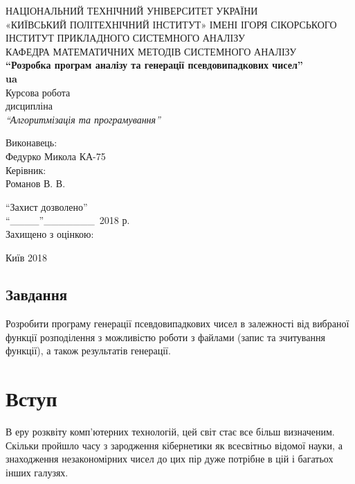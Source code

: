 \documentclass[oneside,final,14pt]{extreport}
\begin{document}
\begin{large}
\begin{centering}
	\thispagestyle{empty}
НАЦІОНАЛЬНИЙ ТЕХНІЧНИЙ УНІВЕРСИТЕТ УКРАЇНИ \\
«КИЇВСЬКИЙ ПОЛІТЕХНІЧНИЙ ІНСТИТУТ» ІМЕНІ ІГОРЯ СІКОРСЬКОГО\\
ІНСТИТУТ ПРИКЛАДНОГО СИСТЕМНОГО АНАЛІЗУ\\
КАФЕДРА МАТЕМАТИЧНИХ МЕТОДІВ СИСТЕМНОГО АНАЛІЗУ\\
\vfill
{\bfseries "`Розробка програм аналізу та генерації псевдовипадкових чисел"'\\
ua}\\
Курсова робота\\
дисципліна\\
{\itshape "`Алгоритмізація та програмування"'}\\
\end{centering}
\vfill



\begin{flushright}
 Виконавець:\\
	Федурко Микола КА-75\\
Керівник:\\
Романов В. В.\\
\end{flushright}
\bigskip
\begin{flushleft}
“Захист дозволено”\\
“\_\_\_\_”\_\_\_\_\_\_\_\ 2018 р.\\
Захищено з оцінкою:\\
\vfill
\centerline{
Київ 2018}
\end{flushleft}
\newpage
\setcounter{page}{2}
\section*{Завдання}\label{s:0}
Розробити програму генерації псевдовипадкових чисел в залежності від вибраної 
функції розподілення з можливістю роботи з файлами (запис та зчитування функції),
 а також результатів генерації.
\tableofcontents

\chapter*{Вступ}\label{c:1}
В еру розквіту комп'ютерних технологій, цей світ стає все більш визначеним. 
Скільки пройшло часу з зародження кібернетики як всесвітньо відомої науки, 
а знаходження незакономірних чисел до цих пір дуже потрібне в цій і багатьох 
інших галузях.


\end{large}
\end{document}
